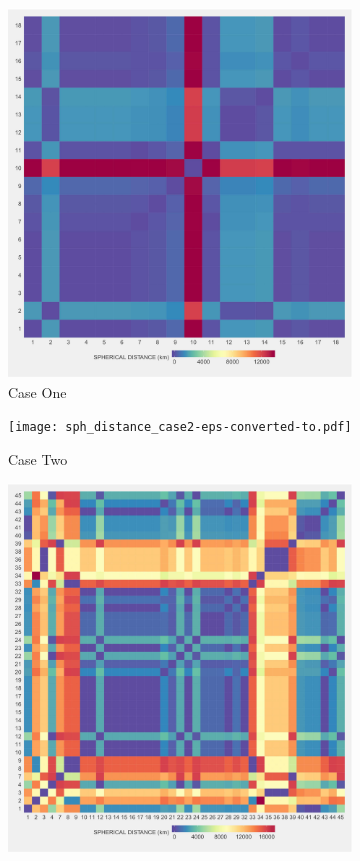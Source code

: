\begin{landscape}
    \begin{figure}
    \centering
    \begin{subfigure}[b]{0.5\textwidth}
        \includegraphics[width=0.9\linewidth]{Images/sph_distance_case1-eps-converted-to.pdf}
        \caption{Case One}
        \label{fig:proximity_c1}
    \end{subfigure} 
    \qquad
    \begin{subfigure}[b]{0.5\textwidth}
        \texttt{[image: sph\_distance\_case2-eps-converted-to.pdf]}
        \caption{Case Two}
        \label{fig:proximity_c2}
    \end{subfigure}
    \qquad
    \begin{subfigure}[b]{0.5\textwidth}
        \includegraphics[width=0.9\linewidth]{Images/sph_distance_case3-eps-converted-to.pdf}

\end{subfigure}
\end{figure}
\end{landscape}
